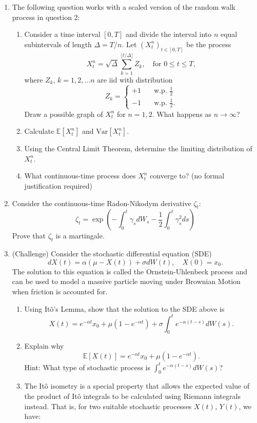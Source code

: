\documentclass[11pt]{article}
\newcommand{\E}{\mathbb{E}}
\begin{document}
\begin{enumerate}
		\item The following question works with a scaled version of the random walk process in question 2:
		\begin{enumerate}
			\item Consider a time interval $[0, T]$ and divide the interval into $n$ equal subintervals of length $\Delta = T/n$. Let $(X_t^{n})_{t\in[0,T]}$ be the process
			\[	X_t^{n} = \sqrt{\Delta}\sum_{k=1}^{\lfloor t/\Delta \rfloor}Z_{k}, \quad \text{for } 0\leq t\leq T,
			\]
			where $Z_{k}$, $k=1,2,...n$ are iid with distribution 
			\[	Z_{k} = \begin{cases}
				+1 &  \quad \text{w.p. } \frac{1}{2} \\
				-1 & \quad \text{w.p. } \frac{1}{2}.
			\end{cases}
			\]
			Draw a possible graph of $X^{n}_{t}$ for $n=1,2$. What happens as $n\to\infty$?
			\item Calculate $\E[X^{n}_{t}]$ and $\text{Var}[X^{n}_{t}]$.
			\item Using the Central Limit Theorem, determine the limiting distribution of $X^{n}_{t}$.
			\item What continuous-time process does $X^{n}_{t}$ converge to? (no formal justification required)
		\end{enumerate}
		\item Consider the continuous-time Radon-Nikodym derivative $\zeta_t$:
		\[	\zeta_t = \exp\left(-\int_{0}^{t}\gamma_{s}dW_s -\frac{1}{2} \int_{0}^{t}\gamma_{s}^{2}ds\right)
		\]
		Prove that $\zeta_t$ is a martingale.
		\item (Challenge) Consider the stochastic differential equation (SDE)
		\[	dX(t) = \alpha(\mu - X(t))+ \sigma dW(t),\quad X(0) = x_{0}.
		\]
		The solution to this equation is called the Ornstein-Uhlenbeck process and can be used to model a massive particle moving under Brownian Motion when friction is accounted for.
		\begin{enumerate}
			\item Using It\^{o}'s Lemma, show that the solution to the SDE above 
			is 
			\[	X(t) = e^{-\alpha t}x_{0} + \mu(1 - e^{-\alpha t}) + \sigma\int_{0}^{t}e^{-\alpha(t - s)}dW(s).
			\]
			\item Explain why 
			\[	\E[X(t)] = e^{-\alpha t}x_{0} + \mu(1 - e^{-\alpha t}).
			\]
			Hint: What type of stochastic process is $\int_{0}^{t}e^{-\alpha(t - s)}dW(s)$?
			\item The It\^{o} isometry is a special property that allows the expected value of the product of It\^{o} integrals to be calculated using Riemann integrals instead. That is, for two suitable stochastic processes $X(t)$, $Y(t)$, we have:

\end{enumerate}
\end{enumerate}
\end{document}
